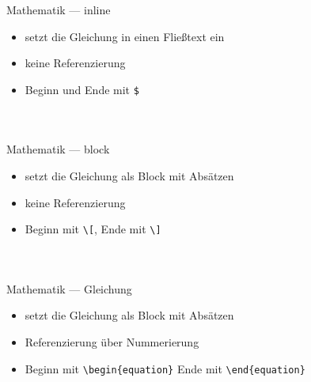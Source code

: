 \documentclass[presentation,aspectratio=169]{beamer}
\begin{document}
\begin{frame}[fragile]{Mathematik --- inline}
  \begin{itemize}
    \item setzt die Gleichung in einen Fließtext ein
    \item keine Referenzierung
    \item Beginn und Ende mit \verb|$|
  \end{itemize}
  
  \begin{columns}
    \begin{column}{.4\textwidth}
      
    \end{column}
    \begin{column}{.4\textwidth}
      \inputminted{latex}{codebeispiele/math-inline.tex}
    \end{column}
  \end{columns}
\end{frame}

\begin{frame}[fragile]{Mathematik --- block}
  \begin{itemize}
    \item setzt die Gleichung als Block mit Absätzen
    \item keine Referenzierung
    \item Beginn mit \verb|\[|, Ende mit \verb|\]|
  \end{itemize}
  
  \bigskip

  \begin{columns}
    \begin{column}{.4\textwidth}
      
    \end{column}
    \begin{column}{.4\textwidth}
      \inputminted{latex}{codebeispiele/math-block.tex}
    \end{column}
  \end{columns}
\end{frame}

\begin{frame}[fragile]{Mathematik --- Gleichung}
  \begin{itemize}
    \item setzt die Gleichung als Block mit Absätzen
    \item Referenzierung über Nummerierung
    \item Beginn mit \verb|\begin{equation}| Ende mit \verb|\end{equation}|
  \end{itemize}
  
  \begin{columns}
    \begin{column}{.4\textwidth}
      
    \end{column}
    \begin{column}{.5\textwidth}
      \inputminted{latex}{codebeispiele/math-equation.tex}
    \end{column}
  \end{columns}
\end{frame}
\end{document}
